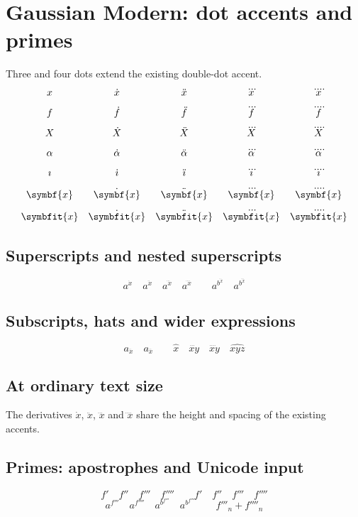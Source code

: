 \documentclass[12pt]{article}
\newcommand{\dotrow}[1]{#1 & \dot{#1} & \ddot{#1} & \dddot{#1} & \ddddot{#1}}
\begin{document}
\section*{Gaussian Modern: dot accents and primes}
Three and four dots extend the existing double-dot accent.
\[
\begin{array}{ccccc}
\dotrow{x} \\[8pt]
\dotrow{f} \\[8pt]
\dotrow{X} \\[8pt]
\dotrow{\alpha} \\[8pt]
\dotrow{\imath} \\[8pt]
\dotrow{\symbf{x}} \\[8pt]
\dotrow{\symbfit{x}}
\end{array}
\]
\subsection*{Superscripts and nested superscripts}
\[
a^{\dot{x}}\quad a^{\ddot{x}}\quad a^{\dddot{x}}\quad a^{\ddddot{x}}
\qquad a^{b^{\dddot{x}}}\quad a^{b^{\ddddot{x}}}
\]
\subsection*{Subscripts, hats and wider expressions}
\[
a_{\dddot{x}}\quad a_{\ddddot{x}}\qquad
\hat{x}\quad\dddot{xy}\quad\ddddot{xy}\quad\widehat{xyz}
\]
\subsection*{At ordinary text size}
The derivatives $\dot{x}$, $\ddot{x}$, $\dddot{x}$ and $\ddddot{x}$
share the height and spacing of the existing accents.
\subsection*{Primes: apostrophes and Unicode input}
\[
f'\quad f''\quad f'''\quad f''''\qquad
f′\quad f″\quad f‴\quad f⁗
\]
\[
a^{f'''}\quad a^{f''''}\quad a^{b^{f'''}}\quad a^{b^{f''''}}
\qquad f'''_n+f''''_n
\]
\end{document}
